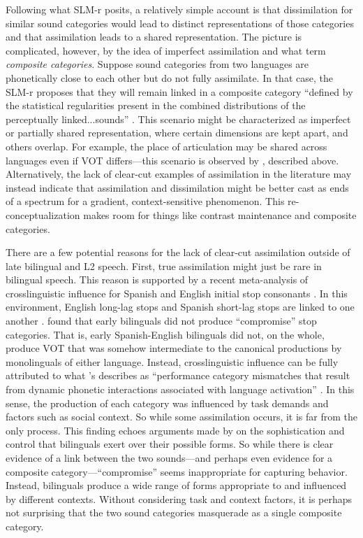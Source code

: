 Following what SLM-r posits, a relatively simple account is that dissimilation for similar sound categories would lead to distinct representations of those categories and that assimilation leads to a shared representation. The picture is complicated, however, by the idea of imperfect assimilation and what \citeauthor{flege_2021_slmr} term \textit{composite categories}. Suppose sound categories from two languages are phonetically close to each other but do not fully assimilate. In that case, the SLM-r proposes that they will remain linked in a composite category ``defined by the statistical regularities present in the combined distributions of the perceptually linked...sounds'' \citep[][p. 41]{flege_2021_slmr}. This scenario might be characterized as imperfect or partially shared representation, where certain dimensions are kept apart, and others overlap. For example, the place of articulation may be shared across languages even if VOT differs---this scenario is observed by \citet{sundara_2006_production}, described above. Alternatively, the lack of clear-cut examples of assimilation in the literature may instead indicate that assimilation and dissimilation might be better cast as ends of a spectrum for a gradient, context-sensitive phenomenon. This re-conceptualization makes room for things like contrast maintenance and composite categories. 

There are a few potential reasons for the lack of clear-cut assimilation outside of late bilingual and L2 speech. First, true assimilation might just be rare in bilingual speech. This reason is supported by a recent meta-analysis of crosslinguistic influence for Spanish and English initial stop consonants \citep{casillas_2021_interlingual}. In this environment, English long-lag stops and Spanish short-lag stops are linked to one another \citep{fricke_2016_phonetic, goldrick_2014_switching, bullock_2009_sociophonetics, olson_2016_transfer}. \citeauthor{casillas_2021_interlingual} found that early bilinguals did not produce ``compromise'' stop categories. That is, early Spanish-English bilinguals did not, on the whole, produce VOT that was somehow intermediate to the canonical productions by monolinguals of either language. Instead, crosslinguistic influence can be fully attributed to what \citeauthor{casillas_2021_interlingual}'s describes as ``performance category mismatches that result from dynamic phonetic interactions associated with language activation'' \citeyearpar[][p. 16]{casillas_2021_interlingual}. In this sense, the production of each category was influenced by task demands and factors such as social context. So while some assimilation occurs, it is far from the only process. This finding echoes arguments made by \citet{bullock_2009_sociophonetics} on the sophistication and control that bilinguals exert over their possible forms. So while there is clear evidence of a link between the two sounds---and perhaps even evidence for a composite category---``compromise'' seems inappropriate for capturing behavior. Instead, bilinguals produce a wide range of forms appropriate to and influenced by different contexts. Without considering task and context factors, it is perhaps not surprising that the two sound categories masquerade as a single composite category. 

